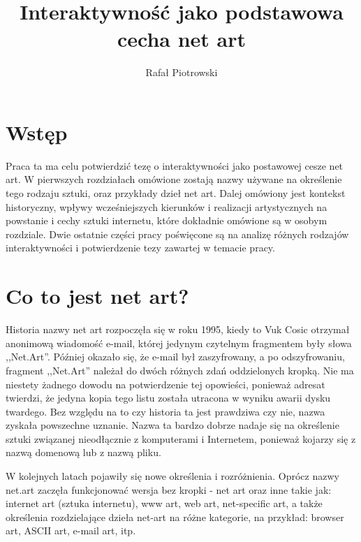\documentclass[a4paper,12pt]{article}
\author{Rafał Piotrowski}
\title{Interaktywność jako podstawowa cecha net art}
\begin{document}
\maketitle


\section{Wstęp}
Praca ta ma celu potwierdzić tezę o interaktywności
jako postawowej cesze net art. W pierwszych rozdziałach omówione
zostają nazwy używane na określenie tego rodzaju sztuki,
oraz przykłady dzieł net art. Dalej omówiony jest kontekst historyczny,
wpływy wcześniejszych kierunków i realizacji artystycznych na powstanie
i cechy sztuki internetu, które dokładnie omówione są w osobym rozdziale.
Dwie ostatnie części pracy poświęcone są na analizę różnych rodzajów
interaktywności i potwierdzenie tezy zawartej w temacie pracy.

\section{Co to jest net art?}

Historia nazwy net art rozpoczęła się w roku 1995, kiedy to Vuk Cosic
otrzymał anonimową wiadomość e-mail, której jedynym czytelnym fragmentem
były słowa ,,Net.Art''. Później okazało się, że e-mail był zaszyfrowany,
a po odszyfrowaniu, fragment ,,Net.Art'' należał do dwóch różnych zdań
oddzielonych kropką. Nie ma niestety żadnego dowodu na potwierdzenie
tej opowieści, ponieważ adresat twierdzi, że jedyna kopia tego listu
została utracona w wyniku awarii dysku twardego. Bez względu na to
czy historia ta jest prawdziwa czy nie, nazwa zyskała powszechne uznanie.
Nazwa ta bardzo dobrze nadaje się na określenie sztuki związanej
nieodłącznie z komputerami i Internetem, ponieważ kojarzy się
z nazwą domenową lub z nazwą pliku.

W kolejnych latach pojawiły się nowe określenia i rozróżnienia.
Oprócz nazwy net.art zaczęła funkcjonować wersja bez kropki - net art
oraz inne takie jak: internet art (sztuka internetu), www art, web art,
net-specific art, a także określenia rozdzielające dzieła net-art
na różne kategorie, na przykład: browser art, ASCII art, e-mail art, itp.
\end{document}
